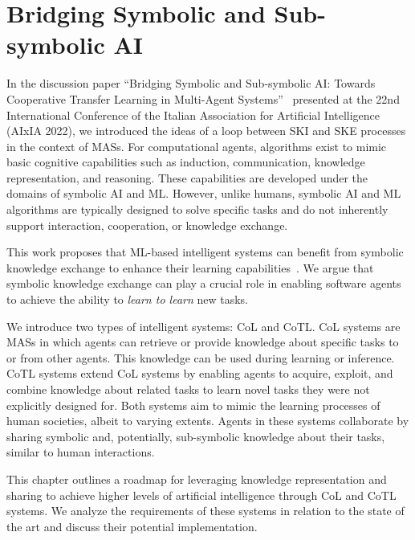 \section{Bridging Symbolic and Sub-symbolic \gls{AI}}
\label{sec:cycle-ski-ske}
%
In the discussion paper ``Bridging Symbolic and Sub-symbolic AI: Towards Cooperative Transfer Learning in Multi-Agent Systems''~\cite{DBLP:conf/aiia/MagniniCO22} presented at the 22nd International Conference of the Italian Association for Artificial Intelligence (AIxIA 2022), we introduced the ideas of a loop between \gls{SKI} and \gls{SKE} processes in the context of \glspl{MAS}.
%
For computational agents, algorithms exist to mimic basic cognitive capabilities such as induction, communication, knowledge representation, and reasoning.
%
These capabilities are developed under the domains of symbolic \gls{AI} and \gls{ML}.
%
However, unlike humans, symbolic \gls{AI} and \gls{ML} algorithms are typically designed to solve specific tasks and do not inherently support interaction, cooperation, or knowledge exchange.


This work proposes that \gls{ML}-based intelligent systems can benefit from symbolic knowledge exchange to enhance their learning capabilities~\cite{imagination-extraamas2021,not-just-for-humans-omicini-2020,expectation-extraamas2021}.
%
We argue that symbolic knowledge exchange can play a crucial role in enabling software agents to achieve the ability to \emph{learn to learn} new tasks.


We introduce two types of intelligent systems: \gls{CoL} and \gls{CoTL}.
%
\Gls{CoL} systems are \glspl{MAS} in which agents can retrieve or provide knowledge about specific tasks to or from other agents.
%
This knowledge can be used during learning or inference.
%
\gls{CoTL} systems extend \gls{CoL} systems by enabling agents to acquire, exploit, and combine knowledge about related tasks to learn novel tasks they were not explicitly designed for.
%
Both systems aim to mimic the learning processes of human societies, albeit to varying extents.
%
Agents in these systems collaborate by sharing symbolic and, potentially, sub-symbolic knowledge about their tasks, similar to human interactions.

This chapter outlines a roadmap for leveraging knowledge representation and sharing to achieve higher levels of artificial intelligence through \gls{CoL} and \gls{CoTL} systems.
%
We analyze the requirements of these systems in relation to the state of the art and discuss their potential implementation.
%

